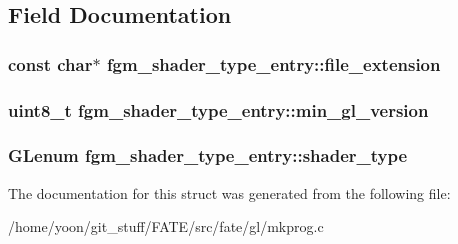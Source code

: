 \subsection{Field Documentation}
\hypertarget{structfgm__shader__type__entry_aa791049c2d92639c7eba150285d314a2}{
\subsubsection[{file\-\_\-extension}]{\setlength{\rightskip}{0pt plus 5cm}const char$\ast$ fgm\-\_\-shader\-\_\-type\-\_\-entry\-::file\-\_\-extension}}\label{structfgm__shader__type__entry_aa791049c2d92639c7eba150285d314a2}
\hypertarget{structfgm__shader__type__entry_a3e6b207b6c4b79ec613475438023ba60}{
\subsubsection[{min\-\_\-gl\-\_\-version}]{\setlength{\rightskip}{0pt plus 5cm}uint8\-\_\-t fgm\-\_\-shader\-\_\-type\-\_\-entry\-::min\-\_\-gl\-\_\-version}}\label{structfgm__shader__type__entry_a3e6b207b6c4b79ec613475438023ba60}
\hypertarget{structfgm__shader__type__entry_a6ecd2bb69be49987dbc0791751d93be7}{
\subsubsection[{shader\-\_\-type}]{\setlength{\rightskip}{0pt plus 5cm}G\-Lenum fgm\-\_\-shader\-\_\-type\-\_\-entry\-::shader\-\_\-type}}\label{structfgm__shader__type__entry_a6ecd2bb69be49987dbc0791751d93be7}


The documentation for this struct was generated from the following file\-:\begin{DoxyCompactItemize}
\item 
/home/yoon/git\-\_\-stuff/\-F\-A\-T\-E/src/fate/gl/mkprog.\-c\end{DoxyCompactItemize}
